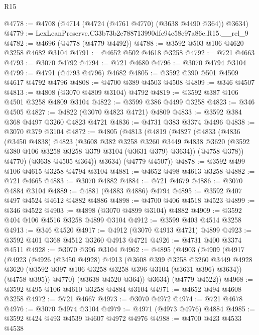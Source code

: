 \begin{lexlean}{R15}
\begin{coremodule}
@4778 := @4708 (@4714 (@4724 (@4761 @4770) (@3638 @4490 @364)) @3634)
@4779 := LexLeanPreserve.C33b73b2e788713990dfe94c58c97a86e.R15.__rel_9
@4782 := @4696 (@4778 (@4779 @4492))
@4788 := @3592 @503 @106 @4620 @3258 @4682 @3104
@4791 := @4652 @502 @4618 @3258
@4792 := @721 @4663
@4793 := @3070 @4792
@4794 := @721 @4680
@4796 := @3070 @4794 @3104
@4799 := @4791 (@4793 @4796) @4682
@4805 := @3592 @390 @501 @4509 @4617 @4792 @4796
@4808 := @4700 @389 @4503 @4508
@4809 := @346 @4507
@4813 := @4808 (@3070 @4809 @3104) @4792
@4819 := @3592 @387 @106 @4501 @3258 @4809 @3104
@4822 := @3599 @386 @4499 @3258
@4823 := @346 @4505
@4827 := @4822 (@3070 @4823 @4721) @4809
@4833 := @3592 @384 @368 @4497 @3260 @4823 @4721
@4836 := @4731 @383 @3374 @4496
@4838 := @3070 @379 @3104
@4872 := @4805
    (@4813
      (@4819
        (@4827
          (@4833
            (@4836
              (@3450 @4838)
              @4823
              (@3608
                @382
                @3258
                @3260
                @3449
                @4838
                @3620
                (@3592 @380 @106 @3258 @3258 @379 @3104 (@3631 @379) @3634))
              (@4758 @378))
            @4770)
          (@3638 @4505 @364))
        @3634)
      (@4779 @4507))
@4878 := @3592 @499 @106 @4615 @3258 @4794 @3104
@4881 := @4652 @498 @4613 @3258
@4882 := @721 @4665
@4883 := @3070 @4882
@4884 := @721 @4679
@4886 := @3070 @4884 @3104
@4889 := @4881 (@4883 @4886) @4794
@4895 := @3592 @407 @497 @4524 @4612 @4882 @4886
@4898 := @4700 @406 @4518 @4523
@4899 := @346 @4522
@4903 := @4898 (@3070 @4899 @3104) @4882
@4909 := @3592 @404 @106 @4516 @3258 @4899 @3104
@4912 := @3599 @403 @4514 @3258
@4913 := @346 @4520
@4917 := @4912 (@3070 @4913 @4721) @4899
@4923 := @3592 @401 @368 @4512 @3260 @4913 @4721
@4926 := @4731 @400 @3374 @4511
@4928 := @3070 @396 @3104
@4962 := @4895
    (@4903
      (@4909
        (@4917
          (@4923
            (@4926
              (@3450 @4928)
              @4913
              (@3608
                @399
                @3258
                @3260
                @3449
                @4928
                @3620
                (@3592 @397 @106 @3258 @3258 @396 @3104 (@3631 @396) @3634))
              (@4758 @395))
            @4770)
          (@3638 @4520 @364))
        @3634)
      (@4779 @4522))
@4968 := @3592 @495 @106 @4610 @3258 @4884 @3104
@4971 := @4652 @494 @4608 @3258
@4972 := @721 @4667
@4973 := @3070 @4972
@4974 := @721 @4678
@4976 := @3070 @4974 @3104
@4979 := @4971 (@4973 @4976) @4884
@4985 := @3592 @424 @493 @4539 @4607 @4972 @4976
@4988 := @4700 @423 @4533 @4538

\end{coremodule}
\end{lexlean}
